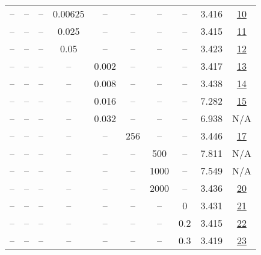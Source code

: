 \begin{table}[H]
\begin{tabular}{cccccccccc}
-- & -- & -- & 0.00625 & -- & -- & -- & -- & 3.416 & \href{https://wandb.ai/stanford-mercury/optimizer-scaling/runs/sweep-130m-5B-sophia71fcc7lr0.004-wd0.1-minlr0-warmup4000-b10.95-b2beb6}{10} \\
-- & -- & -- & 0.025 & -- & -- & -- & -- & 3.415 & \href{https://wandb.ai/stanford-mercury/optimizer-scaling/runs/sweep-130m-5B-sophia44343dlr0.004-wd0.1-minlr0-warmup4000-b10.95-eb3b87}{11} \\
-- & -- & -- & 0.05 & -- & -- & -- & -- & 3.423 & \href{https://wandb.ai/stanford-mercury/optimizer-scaling/runs/sweep-130m-5B-sophia6a0777lr0.004-wd0.1-minlr0-warmup4000-b10.95-4324f1}{12} \\
-- & -- & -- & -- & 0.002 & -- & -- & -- & 3.417 & \href{https://wandb.ai/stanford-mercury/optimizer-scaling/runs/sweep-130m-5B-sophia79c48clr0.002-wd0.1-minlr0-warmup4000-b10.95-b4ff84}{13} \\
-- & -- & -- & -- & 0.008 & -- & -- & -- & 3.438 & \href{https://wandb.ai/stanford-mercury/optimizer-scaling/runs/sweep-130m-5B-sophia684222lr0.008-wd0.1-minlr0-warmup4000-b10.95-6fdc65}{14} \\
-- & -- & -- & -- & 0.016 & -- & -- & -- & 7.282 & \href{https://wandb.ai/stanford-mercury/optimizer-scaling/runs/sweep-130m-5B-sophia1f0f26lr0.016-wd0.1-minlr0-warmup4000-b10.95-cb9dad}{15} \\
-- & -- & -- & -- & 0.032 & -- & -- & -- & 6.938 & N/A \\
-- & -- & -- & -- & -- & 256 & -- & -- & 3.446 & \href{https://wandb.ai/stanford-mercury/optimizer-scaling/runs/sweep-130m-5B-sophiab3dd57lr0.004-wd0.1-minlr0-warmup4000-b10.95-d5f058}{17} \\
-- & -- & -- & -- & -- & -- & 500 & -- & 7.811 & N/A \\
-- & -- & -- & -- & -- & -- & 1000 & -- & 7.549 & N/A \\
-- & -- & -- & -- & -- & -- & 2000 & -- & 3.436 & \href{https://wandb.ai/stanford-mercury/optimizer-scaling/runs/sweep-130m-5B-sophia31c239lr0.004-wd0.1-minlr0-warmup2000-b10.95-da09aa}{20} \\
-- & -- & -- & -- & -- & -- & -- & 0 & 3.431 & \href{https://wandb.ai/stanford-mercury/optimizer-scaling/runs/sweep-130m-5B-sophia7d16e4lr0.004-wd0-minlr0-warmup4000-b10.95-b-a90ebf}{21} \\
-- & -- & -- & -- & -- & -- & -- & 0.2 & 3.415 & \href{https://wandb.ai/stanford-mercury/optimizer-scaling/runs/sweep-130m-5B-sophiaa16477lr0.004-wd0.2-minlr0-warmup4000-b10.95-26c88c}{22} \\
-- & -- & -- & -- & -- & -- & -- & 0.3 & 3.419 & \href{https://wandb.ai/stanford-mercury/optimizer-scaling/runs/sweep-130m-5B-sophiac38c12lr0.004-wd0.3-minlr0-warmup4000-b10.95-aa41b5}{23} \\
\bottomrule
\end{tabular}
\end{table}

